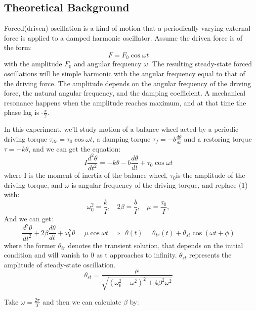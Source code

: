 \documentclass[12pt,a4paper]{article}
\begin{document}
\subsection{Theoretical Background}
\qquad Forced(driven) oscillation is a kind of motion that a periodically varying external force 
is applied to a damped harmonic oscillator. Assume the driven force is of the form:
\begin{equation}
    F=F_0\cos{\omega t}
    \nonumber
\end{equation}
with the amplitude $F_0$ and angular frequency $\omega$. The resulting steady-state forced 
oscillations will be simple harmonic with the angular frequency equal to that of the driving
force. The amplitude depends on the angular frequency of the driving force, the natural angular 
frequency, and the damping coefficient. A mechanical resonance happens when the amplitude reaches 
maximum, and at that time the phase lag is -$\frac{\pi}{2}$.\par
In this experiment, we'll study  motion of a balance wheel acted by a periodic driving
torque $\tau_{dr}=\tau_0\cos{\omega t}$, a damping torque $\tau_f=-b\frac{d\theta}{dt}$ and a restoring
torque $\tau=-k\theta$, and we can get the equation:
\begin{equation}
    I \frac{d^{2} \theta}{d t^{2}}=-k \theta-b \frac{d \theta}{d t}+\tau_{0} \cos \omega t
\end{equation}
where I is the moment of inertia of the balance wheel, $\tau_0$is the amplitude of the 
driving torque, and $\omega$ is angular frequency of the driving torque, and replace (1) with:
\begin{equation}
    \omega_0^2=\frac{k}{I},\ \ \ \ 2\beta=\frac{b}{I}, \ \ \ \ \mu=\frac{\tau_0}{I},
    \nonumber
\end{equation}
And we can get:
\begin{equation}
    \frac{d^2\theta}{dt^2}+2\beta\frac{d\theta}{dt}+\omega_0^2\theta=\mu\cos{\omega t} \ \ \Rightarrow \ \  \theta(t)=\theta_{tr}(t)+\theta_{st}\cos{(\omega t+\phi)}
    \nonumber
\end{equation}
where the former $\theta_{tr}$ denotes the transient solution, that depends on the initial condition and will
vanish to 0 as t approaches to infinity. $\theta_{st}$ represents the amplitude of steady-state oscillation.
\begin{equation}
    \theta_{st}=\frac{\mu}{\sqrt{(\omega_0^2-\omega^2)^2+4\beta^2\omega^2}}
    \nonumber
\end{equation}
\par Take $\omega=\frac{2\pi}{T}$ and then we can calculate $\beta$ by:
\end{document}
